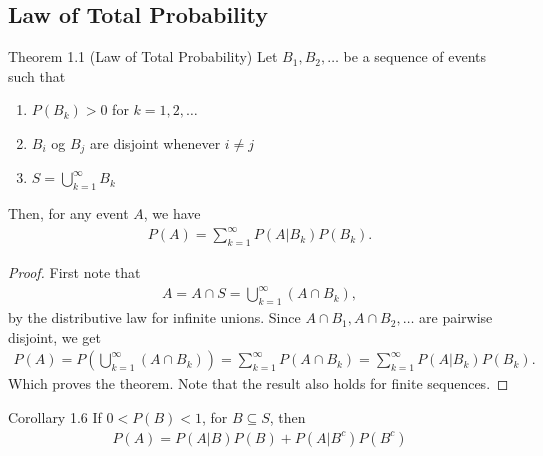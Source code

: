 \subsection{Law of Total Probability}
\begin{boks}{Theorem 1.1 (Law of Total Probability)}
    Let $B_1, B_2, \ldots$ be a sequence of events such that
    \begin{enumerate}
        \item $P(B_k) > 0$ for $k = 1, 2, \ldots$
        \item $B_i$ og $B_j$ are disjoint whenever $i \neq j$
        \item $S = \bigcup_{k=1}^\infty B_k$
    \end{enumerate}
    Then, for any event $A$, we have
    \begin{align*}
        P(A) = \sum_{k=1}^\infty P(A|B_k)P(B_k).
    \end{align*}
\end{boks}

\begin{proof}
First note that
\begin{align*}
    A = A \cap S = \bigcup_{k = 1}^\infty (A \cap B_k),
\end{align*}
by the distributive law for infinite unions. Since $A \cap B_1, A \cap B_2, \ldots$ are pairwise disjoint,  we get
\begin{align*}
    P(A) = P \left(\bigcup_{k = 1}^\infty (A \cap B_k)\right) = \sum_{k = 1}^\infty P(A \cap B_k) = \sum_{k = 1}^\infty P(A|B_k)P(B_k).
\end{align*}
Which proves the theorem. Note that the result also holds for finite sequences.
\end{proof}

\begin{boks}{Corollary 1.6}
If $0 < P(B) < 1$, for $B\subseteq S$, then
\begin{align*}
    P(A) = P(A|B)P(B) + P(A|B^c)P(B^c)
\end{align*}
\end{boks}

